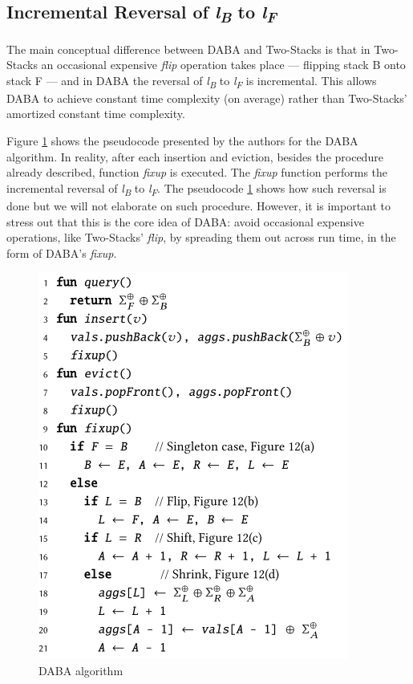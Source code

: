 \subsection*{Incremental Reversal of \textit{l\textsubscript{B}} to \textit{l\textsubscript{F}}}

The main conceptual difference between DABA and Two-Stacks is that in Two-Stacks an occasional expensive \textit{flip} operation takes place --- flipping stack B onto stack F --- and in DABA the reversal of \textit{l\textsubscript{B}} to \textit{l\textsubscript{F}} is incremental. This allows DABA to achieve constant time complexity (on average) rather than Two-Stacks' amortized constant time complexity.

Figure \ref{fig:pseudo-daba} shows the pseudocode presented by the authors for the DABA algorithm. In reality, after each insertion and eviction, besides the procedure already described, function \textit{fixup} is executed. The \textit{fixup} function performs the incremental reversal of \textit{l\textsubscript{B}} to \textit{l\textsubscript{F}}. The pseudocode \ref{fig:pseudo-daba} shows how such reversal is done but we will not elaborate on such procedure. However, it is important to stress out that this is the core idea of DABA: avoid occasional expensive operations, like Two-Stacks' \textit{flip}, by spreading them out across run time, in the form of DABA's \textit{fixup}.

\begin{figure}[!htb]
    \begin{center}
      \includegraphics[scale=0.7]{figures/daba-pseudocode.png}
      \caption{DABA algorithm}
      \label{fig:pseudo-daba}
    \end{center}
\end{figure}


